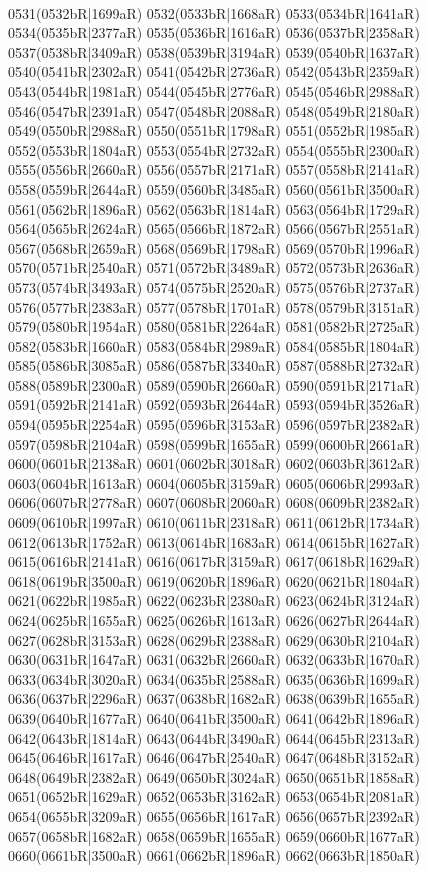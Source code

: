 \\0531(0532bR|1699aR) 0532(0533bR|1668aR) 0533(0534bR|1641aR) 0534(0535bR|2377aR) 0535(0536bR|1616aR) 0536(0537bR|2358aR) 0537(0538bR|3409aR) 0538(0539bR|3194aR) 0539(0540bR|1637aR) \\0540(0541bR|2302aR) 0541(0542bR|2736aR) 0542(0543bR|2359aR) 0543(0544bR|1981aR) 0544(0545bR|2776aR) 0545(0546bR|2988aR) 0546(0547bR|2391aR) 0547(0548bR|2088aR) 0548(0549bR|2180aR) \\0549(0550bR|2988aR) 0550(0551bR|1798aR) 0551(0552bR|1985aR) 0552(0553bR|1804aR) 0553(0554bR|2732aR) 0554(0555bR|2300aR) 0555(0556bR|2660aR) 0556(0557bR|2171aR) 0557(0558bR|2141aR) \\0558(0559bR|2644aR) 0559(0560bR|3485aR) 0560(0561bR|3500aR) 0561(0562bR|1896aR) 0562(0563bR|1814aR) 0563(0564bR|1729aR) 0564(0565bR|2624aR) 0565(0566bR|1872aR) 0566(0567bR|2551aR) \\0567(0568bR|2659aR) 0568(0569bR|1798aR) 0569(0570bR|1996aR) 0570(0571bR|2540aR) 0571(0572bR|3489aR) 0572(0573bR|2636aR) 0573(0574bR|3493aR) 0574(0575bR|2520aR) 0575(0576bR|2737aR) \\0576(0577bR|2383aR) 0577(0578bR|1701aR) 0578(0579bR|3151aR) 0579(0580bR|1954aR) 0580(0581bR|2264aR) 0581(0582bR|2725aR) 0582(0583bR|1660aR) 0583(0584bR|2989aR) 0584(0585bR|1804aR) \\0585(0586bR|3085aR) 0586(0587bR|3340aR) 0587(0588bR|2732aR) 0588(0589bR|2300aR) 0589(0590bR|2660aR) 0590(0591bR|2171aR) 0591(0592bR|2141aR) 0592(0593bR|2644aR) 0593(0594bR|3526aR) \\0594(0595bR|2254aR) 0595(0596bR|3153aR) 0596(0597bR|2382aR) 0597(0598bR|2104aR) 0598(0599bR|1655aR) 0599(0600bR|2661aR) 0600(0601bR|2138aR) 0601(0602bR|3018aR) 0602(0603bR|3612aR) \\0603(0604bR|1613aR) 0604(0605bR|3159aR) 0605(0606bR|2993aR) 0606(0607bR|2778aR) 0607(0608bR|2060aR) 0608(0609bR|2382aR) 0609(0610bR|1997aR) 0610(0611bR|2318aR) 0611(0612bR|1734aR) \\0612(0613bR|1752aR) 0613(0614bR|1683aR) 0614(0615bR|1627aR) 0615(0616bR|2141aR) 0616(0617bR|3159aR) 0617(0618bR|1629aR) 0618(0619bR|3500aR) 0619(0620bR|1896aR) 0620(0621bR|1804aR) \\0621(0622bR|1985aR) 0622(0623bR|2380aR) 0623(0624bR|3124aR) 0624(0625bR|1655aR) 0625(0626bR|1613aR) 0626(0627bR|2644aR) 0627(0628bR|3153aR) 0628(0629bR|2388aR) 0629(0630bR|2104aR) \\0630(0631bR|1647aR) 0631(0632bR|2660aR) 0632(0633bR|1670aR) 0633(0634bR|3020aR) 0634(0635bR|2588aR) 0635(0636bR|1699aR) 0636(0637bR|2296aR) 0637(0638bR|1682aR) 0638(0639bR|1655aR) \\0639(0640bR|1677aR) 0640(0641bR|3500aR) 0641(0642bR|1896aR) 0642(0643bR|1814aR) 0643(0644bR|3490aR) 0644(0645bR|2313aR) 0645(0646bR|1617aR) 0646(0647bR|2540aR) 0647(0648bR|3152aR) \\0648(0649bR|2382aR) 0649(0650bR|3024aR) 0650(0651bR|1858aR) 0651(0652bR|1629aR) 0652(0653bR|3162aR) 0653(0654bR|2081aR) 0654(0655bR|3209aR) 0655(0656bR|1617aR) 0656(0657bR|2392aR) \\0657(0658bR|1682aR) 0658(0659bR|1655aR) 0659(0660bR|1677aR) 0660(0661bR|3500aR) 0661(0662bR|1896aR) 0662(0663bR|1850aR) 